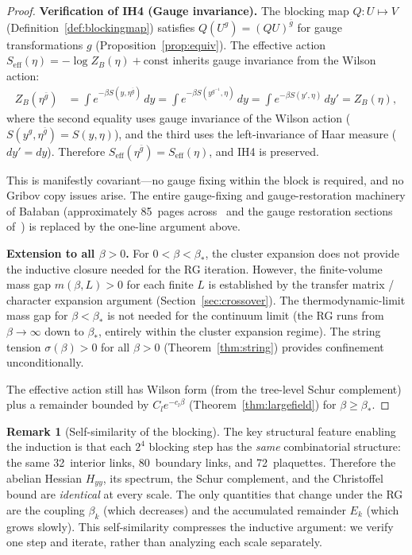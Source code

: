 \documentclass[11pt]{article}
\theoremstyle{definition}
\newtheorem{remark}[theorem]{Remark}
\begin{document}
\begin{proof}
\medskip\noindent\textbf{Verification of IH4 (Gauge invariance).}
The blocking map $Q:U\mapsto V$ (Definition~\ref{def:blockingmap})
satisfies $Q(U^g)=(QU)^{\bar g}$ for gauge transformations $g$
(Proposition~\ref{prop:equiv}).  The effective action
$S_{\mathrm{eff}}(\eta)=-\log Z_B(\eta)+\mathrm{const}$ inherits
gauge invariance from the Wilson action:
\begin{align}
Z_B(\eta^{\bar g})
&=\int e^{-\beta S(y,\eta^{\bar g})}\,dy
=\int e^{-\beta S(y^{g^{-1}},\eta)}\,dy
=\int e^{-\beta S(y',\eta)}\,dy'
=Z_B(\eta),
\end{align}
where the second equality uses gauge invariance of the Wilson action
($S(y^g,\eta^{\bar g})=S(y,\eta)$), and the third uses the
left-invariance of Haar measure ($dy'=dy$).  Therefore
$S_{\mathrm{eff}}(\eta^{\bar g})=S_{\mathrm{eff}}(\eta)$, and IH4
is preserved.

This is manifestly covariant---no gauge fixing within the block is
required, and no Gribov copy issues arise.  The entire gauge-fixing
and gauge-restoration machinery of Ba\l aban (approximately 85~pages
across~\cite{BalabanAvg,BalabanVar} and the gauge restoration
sections of~\cite{BalabanI,BalabanII}) is replaced by the one-line
argument above.

\medskip\noindent\textbf{Extension to all $\beta>0$.}
For $0<\beta<\beta_*$, the cluster expansion does not provide the
inductive closure needed for the RG iteration.
However, the finite-volume mass gap $m(\beta,L)>0$ for each
finite $L$ is established by the transfer matrix / character expansion
argument (Section~\ref{sec:crossover}).
The thermodynamic-limit mass gap for $\beta<\beta_*$ is not needed
for the continuum limit (the RG runs from $\beta\to\infty$ down
to $\beta_*$, entirely within the cluster expansion regime).
The string tension $\sigma(\beta)>0$ for all $\beta>0$
(Theorem~\ref{thm:string}) provides confinement unconditionally.

The effective action still has Wilson form (from the tree-level Schur
complement) plus a remainder bounded by $C_l e^{-c_l\beta}$
(Theorem~\ref{thm:largefield}) for
$\beta\ge\beta_*$.
\end{proof}

\begin{remark}[Self-similarity of the blocking]
The key structural feature enabling the induction is that each $2^4$
blocking step has the \emph{same} combinatorial structure: the same
32~interior links, 80~boundary links, and 72~plaquettes.  Therefore
the abelian Hessian $H_{yy}$, its spectrum, the Schur complement,
and the Christoffel bound are \emph{identical} at every
scale.  The only quantities that change under the RG are the coupling
$\beta_k$ (which decreases) and the accumulated remainder $E_k$
(which grows slowly).  This self-similarity compresses the inductive
argument: we verify one step and iterate, rather than analyzing each
scale separately.
\end{remark}
\end{document}
